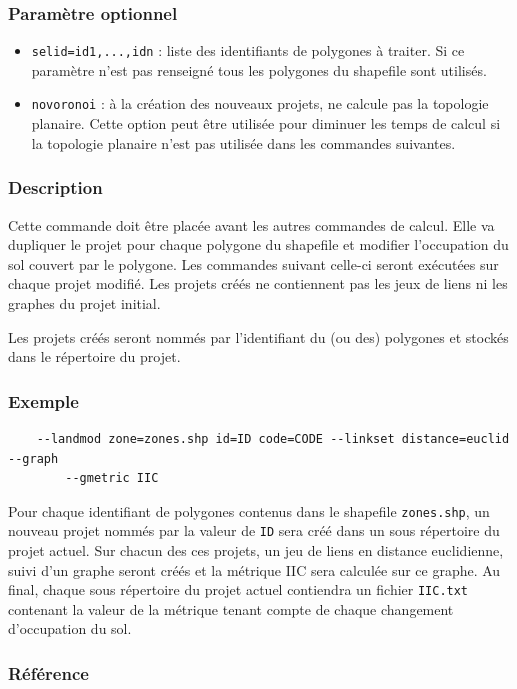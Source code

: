 \documentclass[a4paper,10pt]{report}
\begin{document}
\subsubsection{Paramètre optionnel}
\begin{itemize}
	\item \verb|selid=id1,...,idn| : liste des identifiants de polygones à traiter. Si ce paramètre n'est pas renseigné tous les polygones du shapefile sont utilisés.
	\item \verb|novoronoi| : à la création des nouveaux projets, ne calcule pas la topologie planaire. Cette option peut être utilisée pour diminuer les temps de calcul si la topologie planaire n'est pas utilisée dans les commandes suivantes.
\end{itemize}

\subsubsection{Description}
Cette commande doit être placée avant les autres commandes de calcul. Elle va dupliquer le projet pour chaque polygone du shapefile et modifier l'occupation du sol couvert par le polygone. Les commandes suivant celle-ci seront exécutées sur chaque projet modifié. Les projets créés ne contiennent pas les jeux de liens ni les graphes du projet initial.

Les projets créés seront nommés par l'identifiant du (ou des) polygones et stockés dans le répertoire du projet.

\subsubsection{Exemple}
\begin{Verbatim}
	--landmod zone=zones.shp id=ID code=CODE --linkset distance=euclid --graph 
		--gmetric IIC
\end{Verbatim}
Pour chaque identifiant de polygones contenus dans le shapefile \verb|zones.shp|, un nouveau projet nommés par la valeur de \verb|ID| sera créé dans un sous répertoire du projet actuel. Sur chacun des ces projets, un jeu de liens en distance euclidienne, suivi d'un graphe seront créés et la métrique IIC sera calculée sur ce graphe.
Au final, chaque sous répertoire du projet actuel contiendra un fichier \verb|IIC.txt| contenant la valeur de la métrique tenant compte de chaque changement d'occupation du sol.

\subsubsection{Référence}
\cite{2017_landmod}
\end{document}
